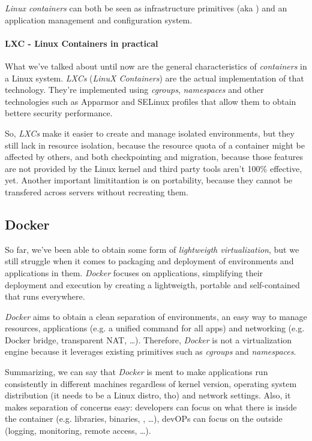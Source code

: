 \begin{note}
    \emph{Linux containers} can both be seen as infrastructure primitives
    (aka ) and an application management and
    configuration system.
\end{note}

\paragraph{LXC - Linux Containers in practical}
What we've talked about until now are the general characteristics of
\emph{containers} in a Linux system. \emph{LXCs} (\emph{LinuX Containers}) are
the actual implementation of that technology. They're implemented using
\emph{cgroups}, \emph{namespaces} and other technologies such as Apparmor and
SELinux profiles that allow them to obtain bettere security performance.

So, \emph{LXCs} make it easier to create and manage isolated environments, but
they still lack in resource isolation, because the resource quota of a container
might be affected by others, and both checkpointing and migration, because those features
are not provided by the Linux kernel and third party tools aren't 100\% effective,
yet. Another important limititantion is on portability, because they cannot be
transfered across servers without recreating them.

\subsection{Docker}
So far, we've been able to obtain some form of \emph{lightweigth virtualization},
but we still struggle when it comes to packaging and deployment of environments
and applications in them. \emph{Docker} focuses on applications,
simplifying their deployment and execution by creating a lightweigth, portable
and self-contained  that runs everywhere.

\emph{Docker} aims to obtain a clean separation of environments, an easy
way to manage resources, applications (e.g. a unified  command for all
apps) and networking (e.g. Docker bridge, transparent NAT, \dots). Therefore,
\emph{Docker} is not a virtualization engine because it leverages existing
primitives such as \emph{cgroups} and \emph{namespaces}.

Summarizing, we can say that \emph{Docker} is ment to make applications run
consistently in different machines regardless of kernel version, operating
system distribution (it needs to be a Linux distro, tho) and network settings.
Also, it makes separation of concerns easy: developers can focus on what there
is inside the container (e.g. libraries, binaries, , \dots), devOPs
can focus on the outside (logging, monitoring, remote access, \dots).

